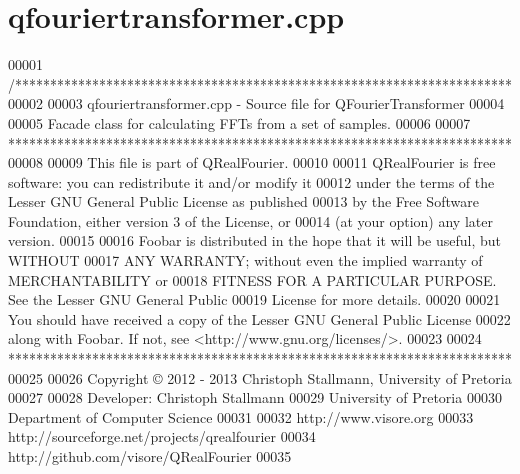 \hypertarget{a00121_source}{\section{qfouriertransformer.\+cpp}
\label{a00121_source}
}

\begin{DoxyCode}
00001 \textcolor{comment}{/***********************************************************************}
00002 \textcolor{comment}{}
00003 \textcolor{comment}{qfouriertransformer.cpp - Source file for QFourierTransformer}
00004 \textcolor{comment}{}
00005 \textcolor{comment}{Facade class for calculating FFTs from a set of samples.}
00006 \textcolor{comment}{}
00007 \textcolor{comment}{************************************************************************}
00008 \textcolor{comment}{}
00009 \textcolor{comment}{This file is part of QRealFourier.}
00010 \textcolor{comment}{}
00011 \textcolor{comment}{QRealFourier is free software: you can redistribute it and/or modify it}
00012 \textcolor{comment}{under the terms of the Lesser GNU General Public License as published}
00013 \textcolor{comment}{by the Free Software Foundation, either version 3 of the License, or}
00014 \textcolor{comment}{(at your option) any later version.}
00015 \textcolor{comment}{}
00016 \textcolor{comment}{Foobar is distributed in the hope that it will be useful, but WITHOUT}
00017 \textcolor{comment}{ANY WARRANTY; without even the implied warranty of MERCHANTABILITY or}
00018 \textcolor{comment}{FITNESS FOR A PARTICULAR PURPOSE.  See the Lesser GNU General Public}
00019 \textcolor{comment}{License for more details.}
00020 \textcolor{comment}{}
00021 \textcolor{comment}{You should have received a copy of the Lesser GNU General Public License}
00022 \textcolor{comment}{along with Foobar.  If not, see <http://www.gnu.org/licenses/>.}
00023 \textcolor{comment}{}
00024 \textcolor{comment}{************************************************************************}
00025 \textcolor{comment}{}
00026 \textcolor{comment}{Copyright © 2012 - 2013 Christoph Stallmann, University of Pretoria}
00027 \textcolor{comment}{}
00028 \textcolor{comment}{Developer: Christoph Stallmann}
00029 \textcolor{comment}{University of Pretoria}
00030 \textcolor{comment}{Department of Computer Science}
00031 \textcolor{comment}{}
00032 \textcolor{comment}{http://www.visore.org}
00033 \textcolor{comment}{http://sourceforge.net/projects/qrealfourier}
00034 \textcolor{comment}{http://github.com/visore/QRealFourier}
00035 \textcolor{comment}{}

\end{DoxyCode}
